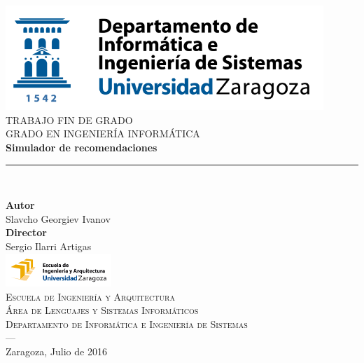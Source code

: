 \begin{titlepage}
 
 
\newlength{\centeroffset}
\setlength{\centeroffset}{-0.5\oddsidemargin}
\addtolength{\centeroffset}{0.5\evensidemargin}
\thispagestyle{empty}

\noindent\hspace*{\centeroffset}\begin{minipage}{\textwidth}

\centering
\includegraphics[width=0.9\textwidth]{imagenes/diislogoblanco_0.png}\\[1.4cm]

\textsc{ \Large TRABAJO FIN DE GRADO\\[0.2cm]}
\textsc{ GRADO EN INGENIERÍA INFORMÁTICA}\\[1cm]
% 
{\Huge\bfseries Simulador de recomendaciones\\
}
\noindent\rule[-1ex]{\textwidth}{3pt}\\[3.5ex]
\end{minipage}

\vspace{2.5cm}
\noindent\hspace*{\centeroffset}\begin{minipage}{\textwidth}
\centering

\textbf{Autor}\\ {Slavcho Georgiev Ivanov}\\[2.5ex]
\textbf{Director}\\
{Sergio Ilarri Artigas}\\[2cm]
\includegraphics[width=0.3\textwidth]{imagenes/logo-eina.png}\\[0.1cm]
\textsc{Escuela de Ingeniería y Arquitectura}\\
\textsc{Área de Lenguajes y Sistemas Informáticos}\\
\textsc{Departamento de Informática e Ingeniería de Sistemas}\\
\textsc{---}\\
Zaragoza, Julio de 2016
\end{minipage}
\end{titlepage}



